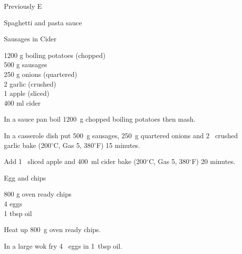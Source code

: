 \begin{menu}{Previously E}
\begin{recipe}{2}{Spaghetti and pasta sauce}
\begin{instructions}
    \end{instructions}
    \end{recipe}%
  
    \begin{recipe}{2}{Sausages in Cider}%
    
		\begin{ingredients}
		1200 g boiling potatoes (chopped) \\
	500 g sausages  \\
	250 g onions (quartered) \\
	2  garlic (crushed) \\
	1  apple (sliced) \\
	400 ml cider  \\
	
		\end{ingredients}
	
    \begin{instructions}
    \item 
        In a sauce pan boil
        1200~g chopped boiling potatoes
        then mash.
      \item 
        In a casserole dish put
        500~g  sausages,
        250~g quartered onions
        and
        2~ crushed garlic
        bake 
      (200$^{\circ}$C, Gas 5, 380$^{\circ}$F)
     15 minutes.
      \item 
        Add 1~ sliced apple
        and
        400~ml  cider
        bake 
      (200$^{\circ}$C, Gas 5, 380$^{\circ}$F)
     20 minutes.
      
    \end{instructions}
    \end{recipe}%
  
    \begin{recipe}{1}{Egg and chips}%
    
		\begin{ingredients}
		800 g oven ready chips  \\
	4  eggs  \\
	1 tbsp oil  \\
	
		\end{ingredients}
	
    \begin{instructions}
    \item 
        Heat up
        800~g  oven ready chips.
      \item 
        In a large wok fry
        4~  eggs
        in
        1~tbsp  oil.
      
    \end{instructions}
    \end{recipe}%
  

\end{menu}
